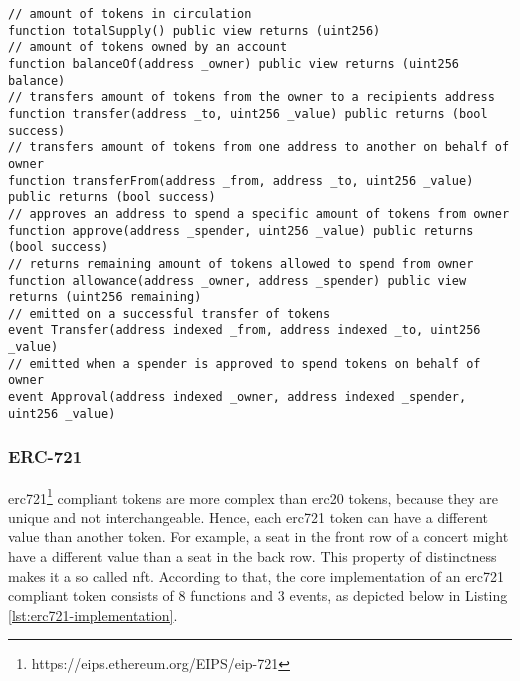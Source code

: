 \begin{lstlisting}[language=Solidity,caption={Core interface of an ERC-20 compliant token},label={lst:erc20-implementation}]
// amount of tokens in circulation
function totalSupply() public view returns (uint256)
// amount of tokens owned by an account
function balanceOf(address _owner) public view returns (uint256 balance)
// transfers amount of tokens from the owner to a recipients address
function transfer(address _to, uint256 _value) public returns (bool success)
// transfers amount of tokens from one address to another on behalf of owner
function transferFrom(address _from, address _to, uint256 _value) public returns (bool success)
// approves an address to spend a specific amount of tokens from owner
function approve(address _spender, uint256 _value) public returns (bool success)
// returns remaining amount of tokens allowed to spend from owner
function allowance(address _owner, address _spender) public view returns (uint256 remaining)
// emitted on a successful transfer of tokens
event Transfer(address indexed _from, address indexed _to, uint256 _value)
// emitted when a spender is approved to spend tokens on behalf of owner
event Approval(address indexed _owner, address indexed _spender, uint256 _value)
\end{lstlisting}

\subsubsection{ERC-721}
\label{subsubsec:erc721}

\acrshort{erc721}\footnote{https://eips.ethereum.org/EIPS/eip-721} compliant tokens are more complex than \acrshort{erc20} tokens, because they are unique and not interchangeable. Hence, each \acrshort{erc721} token can have a different value than another token. For example, a seat in the front row of a concert might have a different value than a seat in the back row. This property of distinctness makes it a so called \acrfull{nft}. According to that, the core implementation of an \acrshort{erc721} compliant token consists of 8 functions and 3 events, as depicted below in Listing \ref{lst:erc721-implementation}.\vspace{3mm}

